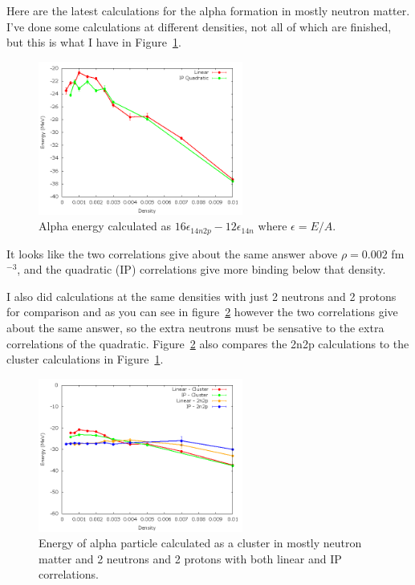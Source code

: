 \documentclass[12pt]{article}
\begin{document}

Here are the latest calculations for the alpha formation in mostly neutron matter. I've done some calculations at different densities, not all of which are finished, but this is what I have in Figure~\ref{fig:alpha}.
\begin{figure}[h!]
   \centering
   \includegraphics[width=0.60\textwidth]{../../alpha.png}
   \caption{Alpha energy calculated as $16\epsilon_{14n2p}-12\epsilon_{14n}$ where $\epsilon=E/A$.}
   \label{fig:alpha}
\end{figure}
It looks like the two correlations give about the same answer above $\rho=0.002$ fm$^{-3}$, and the quadratic (IP) correlations give more binding below that density.

I also did calculations at the same densities with just 2 neutrons and 2 protons for comparison and as you can see in figure~\ref{fig:alpha_and_2n2p} however the two correlations give about the same answer, so the extra neutrons must be sensative to the extra correlations of the quadratic. Figure~\ref{fig:alpha_and_2n2p} also compares the 2n2p calculations to the cluster calculations in Figure~\ref{fig:alpha}.
\begin{figure}[h!]
   \centering
   \includegraphics[width=0.60\textwidth]{../../alpha_and_2n2p.png}
   \caption{Energy of alpha particle calculated as a cluster in mostly neutron matter and 2 neutrons and 2 protons with both linear and IP correlations.}
   \label{fig:alpha_and_2n2p}
\end{figure}
\end{document}
